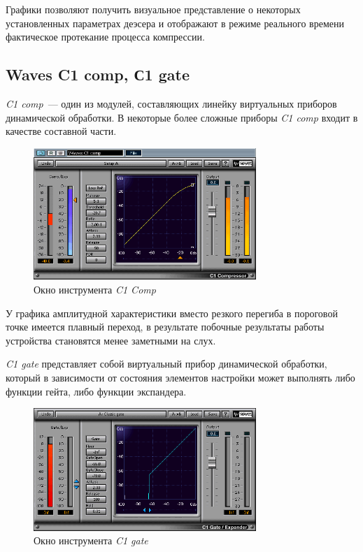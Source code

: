\documentclass[oneside, final, 14pt]{extreport}
\begin{document}
Графики позволяют получить визуальное представление о некоторых установленных параметрах деэсера и отображают в режиме реального времени фактическое протекание процесса компрессии.

\subsection{Waves C1 comp, С1 gate}
\emph{C1 comp}~--- один из модулей, составляющих линейку виртуальных приборов динамической обработки. В некоторые более сложные приборы \emph{C1 comp} входит в качестве составной части.

\begin{figure}[ht!]
  \centering
  \includegraphics[width=0.75\textwidth]{pic-wavescomp-03}
  \caption{Окно инструмента \emph{C1 Comp}}
  \label{pic-wavescomp-03}
\end{figure}

У графика амплитудной характеристики вместо резкого перегиба в пороговой точке имеется плавный переход, в результате побочные результаты работы устройства становятся менее заметными на слух.

\emph{C1 gate} представляет собой виртуальный прибор динамической обработки, который в зависимости от состояния элементов настройки может выполнять либо функции гейта, либо функции экспандера.

\begin{figure}[ht!]
  \centering
  \includegraphics[width=0.75\textwidth]{pic-wavescomp-04}
  \caption{Окно инструмента \emph{C1 gate}}
  \label{pic-wavescomp-04}
\end{figure}
\end{document}
